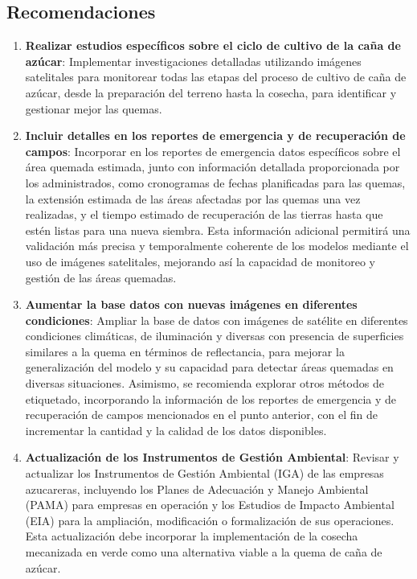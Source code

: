 \subsection{Recomendaciones}

\begin{enumerate}
    \item \textbf{Realizar estudios específicos sobre el ciclo de cultivo de la caña de azúcar}: Implementar investigaciones detalladas utilizando imágenes satelitales para monitorear todas las etapas del proceso de cultivo de caña de azúcar, desde la preparación del terreno hasta la cosecha, para identificar 
    y gestionar mejor las quemas.

    \item \textbf{Incluir detalles en los reportes de emergencia y de recuperación de campos}: Incorporar en los reportes de emergencia datos específicos sobre el área quemada estimada, junto con información detallada proporcionada por los administrados, como cronogramas de fechas planificadas para las quemas, 
    la extensión estimada de las áreas afectadas por las quemas una vez realizadas, y el tiempo estimado de recuperación de las tierras hasta que estén listas para una nueva siembra. Esta información adicional permitirá una validación más precisa y temporalmente coherente de los modelos mediante el uso de imágenes 
    satelitales, mejorando así la capacidad de monitoreo y gestión de las áreas quemadas.

    \item \textbf{Aumentar la base datos con nuevas imágenes en diferentes condiciones}: Ampliar la base de datos con imágenes de satélite en diferentes condiciones climáticas, de iluminación y diversas con presencia de superficies similares a la quema en términos de reflectancia, para mejorar la generalización 
    del modelo y su capacidad para detectar áreas quemadas en diversas situaciones. Asimismo, se recomienda explorar otros métodos de etiquetado, incorporando la información de los reportes de emergencia y de recuperación de campos mencionados en el punto anterior, con el fin de incrementar la cantidad y la calidad 
    de los datos disponibles.

    \item \textbf{Actualización de los Instrumentos de Gestión Ambiental}: Revisar y actualizar los Instrumentos de Gestión Ambiental (IGA) de las empresas azucareras, incluyendo los Planes de Adecuación y Manejo Ambiental (PAMA) para empresas en operación y los Estudios de Impacto Ambiental (EIA) para la ampliación, 
    modificación o formalización de sus operaciones. Esta actualización debe incorporar la implementación de la cosecha mecanizada en verde como una alternativa viable a la quema de caña de azúcar. 
\end{enumerate}


